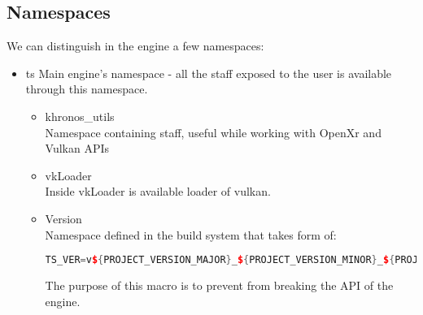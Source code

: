 \subsection{Namespaces}
\label{sec:namespaces}
We can distinguish in the engine a few namespaces:
\begin{itemize}
    \item ts
        Main engine's namespace - all the staff exposed to the user is available through this namespace.
    \begin{itemize}
        \item khronos\_utils\\
            Namespace containing staff, useful while working with OpenXr and Vulkan APIs
        \item vkLoader\\
            Inside vkLoader is available loader of vulkan.
        \item Version\\
            Namespace defined in the build system that takes form of:
            \begin{lstlisting}[language=c++, caption= Definition of TS\_VER preprocessor macro (.engine/CMakeLists.txt)]
TS_VER=v${PROJECT_VERSION_MAJOR}_${PROJECT_VERSION_MINOR}_${PROJECT_VERSION_PATCH}
            \end{lstlisting}
            The purpose of this macro is to prevent from breaking the API of the engine.
    \end{itemize}
\end{itemize}